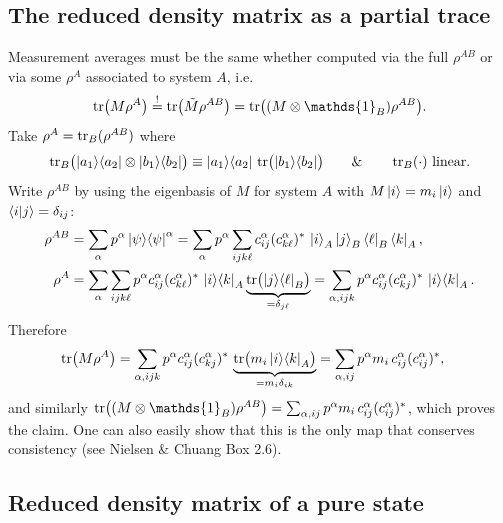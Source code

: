 \documentclass[../../main.tex]{subfiles}
\begin{document}
\subsection{The reduced density matrix as a partial trace}

Measurement averages must be the same whether computed via the full $\rho^{AB}$ or via some
$\rho^{A}$ associated to system $A$, i.e.
\begin{equation}
\Trace\bigl(M\rho^A\bigr)\overset{!}{=}\Trace\bigl(\tilde M\rho^{AB}\bigr)
=\Trace\bigl((M\otimes\mathds{1}_B)\rho^{AB}\bigr).
\end{equation}
Take $\rho^A=\operatorname{tr}_B(\rho^{AB})$ where
\begin{equation}
\operatorname{tr}_B\bigl(\left\lvert a_1 \right\rangle\!\left\langle a_2 \right\rvert\otimes\left\lvert b_1 \right\rangle\!\left\langle b_2 \right\rvert\bigr)
\equiv\left\lvert a_1 \right\rangle\!\left\langle a_2 \right\rvert\,\operatorname{tr}\bigl(\left\lvert b_1 \right\rangle\!\left\langle b_2 \right\rvert\bigr)
\qquad\&\qquad\operatorname{tr}_B(\cdot)\ \text{linear.}
\end{equation}
Write $\rho^{AB}$ by using the eigenbasis of $M$ for system $A$ with $M\left\lvert i \right\rangle=m_i\left\lvert i \right\rangle$ and
$\left\langle i \middle| j \right\rangle=\delta_{ij}$:
\begin{align}
\rho^{AB}&=\sum_\alpha p^\alpha\left\lvert \psi \right\rangle\!\left\langle \psi \right\rvert^\alpha
=\sum_\alpha p^\alpha\sum_{ijk\ell}c_{ij}^\alpha(c_{k\ell}^\alpha)^*\,
\left\lvert i \right\rangle_A\left\lvert j \right\rangle_B\left\langle \ell \right\rvert_B\left\langle k \right\rvert_A,\\
\rho^{A}&=\sum_\alpha\sum_{ijk\ell}p^\alpha c_{ij}^\alpha(c_{k\ell}^\alpha)^*\,
\left\lvert i \right\rangle\!\left\langle k \right\rvert_A\underbrace{\operatorname{tr}\bigl(\left\lvert j \right\rangle\!\left\langle \ell \right\rvert_B\bigr)}_{=\delta_{j\ell}}
=\sum_{\alpha,ijk}p^\alpha c_{ij}^\alpha(c_{kj}^\alpha)^*\,\left\lvert i \right\rangle\!\left\langle k \right\rvert_A.
\end{align}
Therefore
\begin{align}
\operatorname{tr}\bigl(M\rho^A\bigr)
&=\sum_{\alpha,ijk}p^\alpha c_{ij}^\alpha(c_{kj}^\alpha)^*\,
\underbrace{\operatorname{tr}\bigl(m_i\left\lvert i \right\rangle\!\left\langle k \right\rvert_A\bigr)}_{=m_i\delta_{ik}}
=\sum_{\alpha,ij}p^\alpha m_i\,c_{ij}^\alpha(c_{ij}^\alpha)^*,
\end{align}
and similarly $\Trace\bigl((M\otimes\mathds{1}_B)\rho^{AB}\bigr)
=\sum_{\alpha,ij}p^\alpha m_i\,c_{ij}^\alpha(c_{ij}^\alpha)^*$, which proves the claim. One can
also easily show that this is the only map that conserves consistency (see Nielsen \& Chuang Box 2.6).

\subsection{Reduced density matrix of a pure state}
\end{document}
